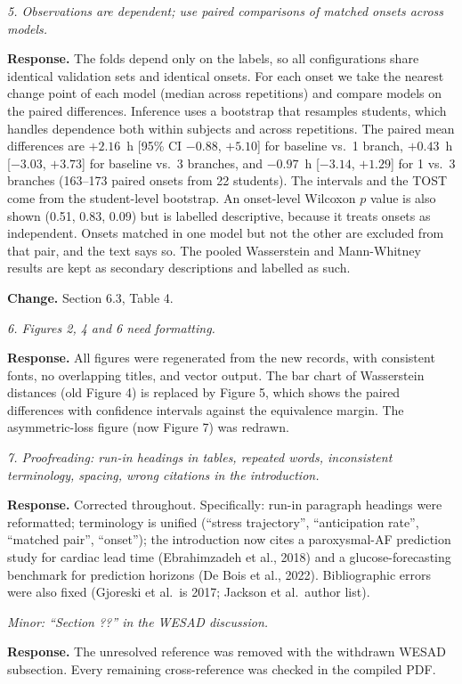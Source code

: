 \documentclass[11pt]{article}
\newenvironment{comment}{\par\medskip\noindent\begin{minipage}{\linewidth}\itshape\color{black!70}}{\end{minipage}\par\smallskip}
\newcommand{\resp}{\noindent\textbf{Response.} }
\newcommand{\change}{\par\noindent\textbf{Change.} }
\begin{document}
\begin{comment}5. Observations are dependent; use paired comparisons of
matched onsets across models.\end{comment}
\resp The folds depend only on the labels, so all configurations share
identical validation sets and identical onsets. For each onset we take
the nearest change point of each model (median across repetitions) and
compare models on the paired differences. Inference uses a bootstrap
that resamples students, which handles dependence both within subjects
and across repetitions. The paired mean differences are $+2.16$~h
[95\% CI $-0.88$, $+5.10$] for baseline vs.\ 1 branch, $+0.43$~h
[$-3.03$, $+3.73$] for baseline vs.\ 3 branches, and $-0.97$~h
[$-3.14$, $+1.29$] for 1 vs.\ 3 branches (163--173 paired onsets from
22 students). The intervals and the TOST come from the student-level
bootstrap. An onset-level Wilcoxon $p$ value is also shown (0.51, 0.83,
0.09) but is labelled descriptive, because it treats onsets as
independent. Onsets matched in one model but not the other are excluded
from that pair, and the text says so. The pooled Wasserstein
and Mann-Whitney results are kept as secondary descriptions and labelled
as such.
\change Section 6.3, Table 4.

\begin{comment}6. Figures 2, 4 and 6 need formatting.\end{comment}
\resp All figures were regenerated from the new records, with consistent
fonts, no overlapping titles, and vector output. The bar chart of
Wasserstein distances (old Figure 4) is replaced by Figure 5, which
shows the paired differences with confidence intervals against the
equivalence margin. The asymmetric-loss figure (now Figure 7) was
redrawn.

\begin{comment}7. Proofreading: run-in headings in tables, repeated words,
inconsistent terminology, spacing, wrong citations in the introduction.\end{comment}
\resp Corrected throughout. Specifically: run-in paragraph headings were
reformatted; terminology is unified (``stress trajectory'',
``anticipation rate'', ``matched pair'', ``onset''); the introduction now
cites a paroxysmal-AF prediction study for cardiac lead time
(Ebrahimzadeh et al., 2018) and a glucose-forecasting benchmark for
prediction horizons (De Bois et al., 2022). Bibliographic errors were
also fixed (Gjoreski et al.\ is 2017; Jackson et al.\ author list).

\begin{comment}Minor: ``Section ??'' in the WESAD discussion.\end{comment}
\resp The unresolved reference was removed with the withdrawn WESAD
subsection. Every remaining cross-reference was checked in the compiled
PDF.
\end{document}
